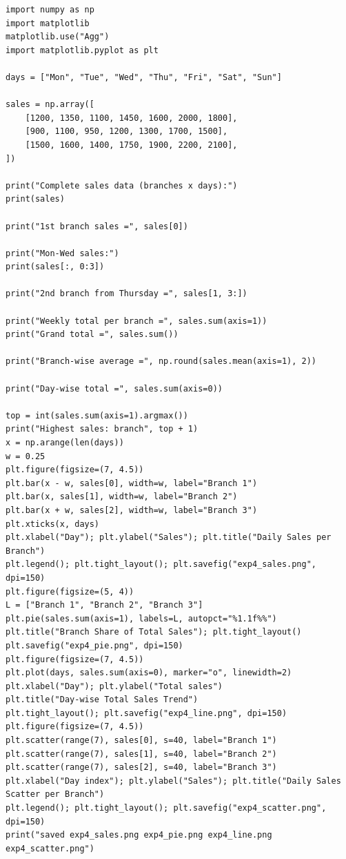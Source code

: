 \documentclass[11pt,twoside]{article}
\begin{document}
\begin{lstlisting}
import numpy as np
import matplotlib
matplotlib.use("Agg")
import matplotlib.pyplot as plt

days = ["Mon", "Tue", "Wed", "Thu", "Fri", "Sat", "Sun"]

sales = np.array([
    [1200, 1350, 1100, 1450, 1600, 2000, 1800],
    [900, 1100, 950, 1200, 1300, 1700, 1500],
    [1500, 1600, 1400, 1750, 1900, 2200, 2100],
])

print("Complete sales data (branches x days):")
print(sales)

print("1st branch sales =", sales[0])

print("Mon-Wed sales:")
print(sales[:, 0:3])

print("2nd branch from Thursday =", sales[1, 3:])

print("Weekly total per branch =", sales.sum(axis=1))
print("Grand total =", sales.sum())

print("Branch-wise average =", np.round(sales.mean(axis=1), 2))

print("Day-wise total =", sales.sum(axis=0))

top = int(sales.sum(axis=1).argmax())
print("Highest sales: branch", top + 1)
x = np.arange(len(days))
w = 0.25
plt.figure(figsize=(7, 4.5))
plt.bar(x - w, sales[0], width=w, label="Branch 1")
plt.bar(x, sales[1], width=w, label="Branch 2")
plt.bar(x + w, sales[2], width=w, label="Branch 3")
plt.xticks(x, days)
plt.xlabel("Day"); plt.ylabel("Sales"); plt.title("Daily Sales per Branch")
plt.legend(); plt.tight_layout(); plt.savefig("exp4_sales.png", dpi=150)
plt.figure(figsize=(5, 4))
L = ["Branch 1", "Branch 2", "Branch 3"]
plt.pie(sales.sum(axis=1), labels=L, autopct="%1.1f%%")
plt.title("Branch Share of Total Sales"); plt.tight_layout()
plt.savefig("exp4_pie.png", dpi=150)
plt.figure(figsize=(7, 4.5))
plt.plot(days, sales.sum(axis=0), marker="o", linewidth=2)
plt.xlabel("Day"); plt.ylabel("Total sales")
plt.title("Day-wise Total Sales Trend")
plt.tight_layout(); plt.savefig("exp4_line.png", dpi=150)
plt.figure(figsize=(7, 4.5))
plt.scatter(range(7), sales[0], s=40, label="Branch 1")
plt.scatter(range(7), sales[1], s=40, label="Branch 2")
plt.scatter(range(7), sales[2], s=40, label="Branch 3")
plt.xlabel("Day index"); plt.ylabel("Sales"); plt.title("Daily Sales Scatter per Branch")
plt.legend(); plt.tight_layout(); plt.savefig("exp4_scatter.png", dpi=150)
print("saved exp4_sales.png exp4_pie.png exp4_line.png exp4_scatter.png")
\end{lstlisting}
\end{document}

